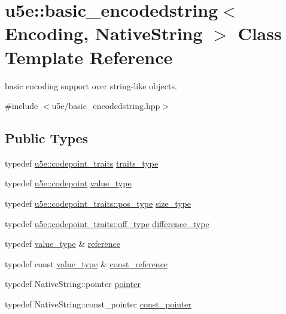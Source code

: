 \hypertarget{classu5e_1_1basic__encodedstring}{}\section{u5e\+:\+:basic\+\_\+encodedstring$<$ Encoding, Native\+String $>$ Class Template Reference}
\label{classu5e_1_1basic__encodedstring}


basic encoding support over string-\/like objects.  




{\ttfamily \#include $<$u5e/basic\+\_\+encodedstring.\+hpp$>$}

\subsection*{Public Types}
{\bf }\par
\begin{DoxyCompactItemize}
\item 
typedef \hyperlink{classu5e_1_1codepoint__traits}{u5e\+::codepoint\+\_\+traits} \hyperlink{classu5e_1_1basic__encodedstring_a3ac9c7e8b96dae6342a47ab933e285ca}{traits\+\_\+type}
\item 
typedef \hyperlink{classu5e_1_1codepoint}{u5e\+::codepoint} \hyperlink{classu5e_1_1basic__encodedstring_a958081aa18370a191d00b33032a203bc}{value\+\_\+type}
\item 
typedef \hyperlink{classu5e_1_1codepoint__traits_afb5588dd802b42f267a6c254ad7842f1}{u5e\+::codepoint\+\_\+traits\+::pos\+\_\+type} \hyperlink{classu5e_1_1basic__encodedstring_afba33e845bb625c7f80cb5874a14f957}{size\+\_\+type}
\item 
typedef \hyperlink{classu5e_1_1codepoint__traits_ab169bad68f239d5248f82749a2962346}{u5e\+::codepoint\+\_\+traits\+::off\+\_\+type} \hyperlink{classu5e_1_1basic__encodedstring_a73562c9a665a0bc4816bf79983dcfbb1}{difference\+\_\+type}
\item 
typedef \hyperlink{classu5e_1_1basic__encodedstring_a958081aa18370a191d00b33032a203bc}{value\+\_\+type} \& \hyperlink{classu5e_1_1basic__encodedstring_a543f128888d49bf71508d1e4c705aeba}{reference}
\item 
typedef const \hyperlink{classu5e_1_1basic__encodedstring_a958081aa18370a191d00b33032a203bc}{value\+\_\+type} \& \hyperlink{classu5e_1_1basic__encodedstring_a4652a99a020af37293ab37f638282832}{const\+\_\+reference}
\item 
typedef Native\+String\+::pointer \hyperlink{classu5e_1_1basic__encodedstring_a623b4942f22b5976802f7745aae892cd}{pointer}
\item 
typedef Native\+String\+::const\+\_\+pointer \hyperlink{classu5e_1_1basic__encodedstring_aa26a9042f17c34e711979c7089045ee2}{const\+\_\+pointer}
\end{DoxyCompactItemize}

